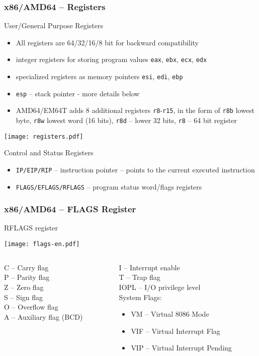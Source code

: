 \documentclass{beamer}
\begin{document}
\begin{frame}[shrink=1.2]
\frametitle{x86/AMD64 -- Registers}
\small
User/General Purpose Registers
\begin{itemize}
\item All registers are 64/32/16/8 bit for backward compatibility
\item integer registers for storing program values ​​\texttt{eax}, \texttt{ebx}, \texttt{ecx}, \texttt{edx}
\item specialized registers as memory pointers \texttt{esi}, \texttt{edi}, \texttt{ebp}
\item \texttt{esp} -- stack pointer - more details below
\item AMD64/EM64T adds 8 additional registers \texttt{r8}-\texttt{r15}, in the form of \texttt{r8b} lowest byte, \texttt{r8w} lowest word (16 bits), \texttt{r8d} -- lower 32 bits, \texttt{r8} -- 64 bit register
\end{itemize}
\begin{center}
\texttt{[image: registers.pdf]}
\end{center}
Control and Status Registers
\begin{itemize}
\item \texttt{IP/EIP/RIP} -- instruction pointer -- points to the current executed instruction
\item \texttt{FLAGS/EFLAGS/RFLAGS} -- program status word/flags registers
\end{itemize}

\end{frame}



\begin{frame}
\frametitle{x86/AMD64 -- FLAGS Register}
RFLAGS register
\begin{center}
\texttt{[image: flags-en.pdf]}
\end{center}
\begin{columns}[t,onlytextwidth]
\begin{column}{0.5\textwidth}
C -- Carry flag\\
P -- Parity flag\\
Z -- Zero flag\\
S -- Sign flag\\
O -- Overflow flag\\
A -- Auxiliary flag (BCD)
\end{column}
\begin{column}{0.5\textwidth}  
I -- Interrupt enable\\
T -- Trap flag\\
IOPL -- I/O privilege level\\
System Flags:
\begin{itemize}
\item VM -- Virtual 8086 Mode
\item VIF -- Virtual Interrupt Flag
\item VIP -- Virtual Interrupt Pending
\end{itemize}
\end{column}
\end{columns}
\end{frame}
\end{document}
